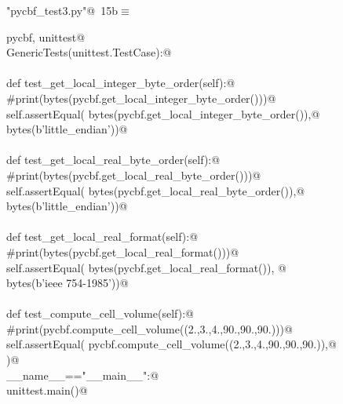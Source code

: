 \documentclass[10pt,a4paper,twoside,notitlepage]{article}
\begin{document}
\begin{flushleft} \small
\begin{minipage}{\linewidth}\label{scrap15}\raggedright\small
{} \verb@"pycbf_test3.py"@\nobreak\ {\footnotesize {15b}}$\equiv$
\vspace{-1ex}
\begin{list}{}{} \item
\mbox{}\verb@import pycbf, unittest@\\
\mbox{}\verb@class GenericTests(unittest.TestCase):@\\
\mbox{}\verb@@\\
\mbox{}\verb@    def test_get_local_integer_byte_order(self):@\\
\mbox{}\verb@        #print(bytes(pycbf.get_local_integer_byte_order()))@\\
\mbox{}\verb@        self.assertEqual( bytes(pycbf.get_local_integer_byte_order()),@\\
\mbox{}\verb@                         bytes(b'little_endian'))@\\
\mbox{}\verb@@\\
\mbox{}\verb@    def test_get_local_real_byte_order(self):@\\
\mbox{}\verb@        #print(bytes(pycbf.get_local_real_byte_order()))@\\
\mbox{}\verb@        self.assertEqual( bytes(pycbf.get_local_real_byte_order()),@\\
\mbox{}\verb@                          bytes(b'little_endian'))@\\
\mbox{}\verb@@\\
\mbox{}\verb@    def test_get_local_real_format(self):@\\
\mbox{}\verb@        #print(bytes(pycbf.get_local_real_format()))@\\
\mbox{}\verb@        self.assertEqual( bytes(pycbf.get_local_real_format()), @\\
\mbox{}\verb@                          bytes(b'ieee 754-1985'))@\\
\mbox{}\verb@@\\
\mbox{}\verb@    def test_compute_cell_volume(self):@\\
\mbox{}\verb@        #print(pycbf.compute_cell_volume((2.,3.,4.,90.,90.,90.)))@\\
\mbox{}\verb@        self.assertEqual( pycbf.compute_cell_volume((2.,3.,4.,90.,90.,90.)),@\\
\mbox{})@\\
\mbox{}\verb@if __name__=="__main__":@\\
\mbox{}\verb@    unittest.main()@\\
\mbox{}\verb@@{\NWsep}
\end{list}
\vspace{-1.5ex}
\footnotesize
\begin{list}{}{\setlength{\itemsep}{-\parsep}\setlength{\itemindent}{-\leftmargin}}

\item{}
\end{list}
\end{minipage}\vspace{4ex}
\end{flushleft}
\end{document}
